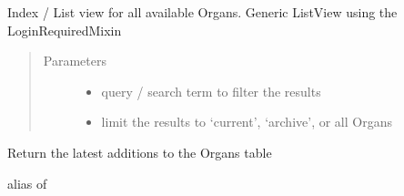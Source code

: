 \documentclass[letterpaper,10pt,openany,oneside,english]{sphinxmanual}
\begin{document}
\begin{fulllineitems}
\label{\detokenize{index:animals.views.OrganIndexView}}
Index / List view for all available Organs.
Generic ListView using the LoginRequiredMixin
\begin{quote}\begin{description}
\item[{Parameters}] \leavevmode\begin{itemize}
\item {} 
 \textendash{} query / search term to filter the results

\item {} 
 \textendash{} limit the results to ‘current’, ‘archive’, or all Organs

\end{itemize}

\end{description}\end{quote}

\begin{fulllineitems}
\label{\detokenize{index:animals.views.OrganIndexView.get_queryset}}
Return the latest additions to the Organs table

\end{fulllineitems}


\begin{fulllineitems}
\label{\detokenize{index:animals.views.OrganIndexView.model}}
alias of 

\end{fulllineitems}


\end{fulllineitems}

\end{document}
